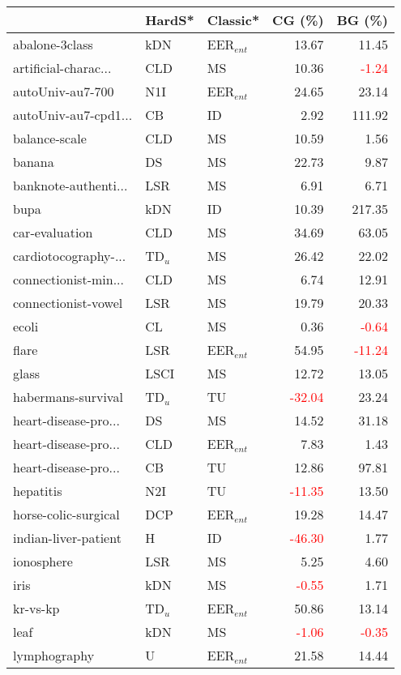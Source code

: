 \begin{tabular}{lllrr}
\toprule
 & HardS* & Classic* & CG (\%) & BG (\%) \\
\midrule
abalone-3class & kDN & EER$_{ent}$ & 13.67 & 11.45 \\
artificial-charac... & CLD & MS & 10.36 & \textcolor{red}{-1.24} \\
autoUniv-au7-700 & N1I & EER$_{ent}$ & 24.65 & 23.14 \\
autoUniv-au7-cpd1... & CB & ID & 2.92 & 111.92 \\
balance-scale & CLD & MS & 10.59 & 1.56 \\
banana & DS & MS & 22.73 & 9.87 \\
banknote-authenti... & LSR & MS & 6.91 & 6.71 \\
bupa & kDN & ID & 10.39 & 217.35 \\
car-evaluation & CLD & MS & 34.69 & 63.05 \\
cardiotocography-... & TD$_{u}$ & MS & 26.42 & 22.02 \\
connectionist-min... & CLD & MS & 6.74 & 12.91 \\
connectionist-vowel & LSR & MS & 19.79 & 20.33 \\
ecoli & CL & MS & 0.36 & \textcolor{red}{-0.64} \\
flare & LSR & EER$_{ent}$ & 54.95 & \textcolor{red}{-11.24} \\
glass & LSCI & MS & 12.72 & 13.05 \\
habermans-survival & TD$_{u}$ & TU & \textcolor{red}{-32.04} & 23.24 \\
heart-disease-pro... & DS & MS & 14.52 & 31.18 \\
heart-disease-pro... & CLD & EER$_{ent}$ & 7.83 & 1.43 \\
heart-disease-pro... & CB & TU & 12.86 & 97.81 \\
hepatitis & N2I & TU & \textcolor{red}{-11.35} & 13.50 \\
horse-colic-surgical & DCP & EER$_{ent}$ & 19.28 & 14.47 \\
indian-liver-patient & H & ID & \textcolor{red}{-46.30} & 1.77 \\
ionosphere & LSR & MS & 5.25 & 4.60 \\
iris & kDN & MS & \textcolor{red}{-0.55} & 1.71 \\
kr-vs-kp & TD$_{u}$ & EER$_{ent}$ & 50.86 & 13.14 \\
leaf & kDN & MS & \textcolor{red}{-1.06} & \textcolor{red}{-0.35} \\
lymphography & U & EER$_{ent}$ & 21.58 & 14.44 \\

\end{tabular}
